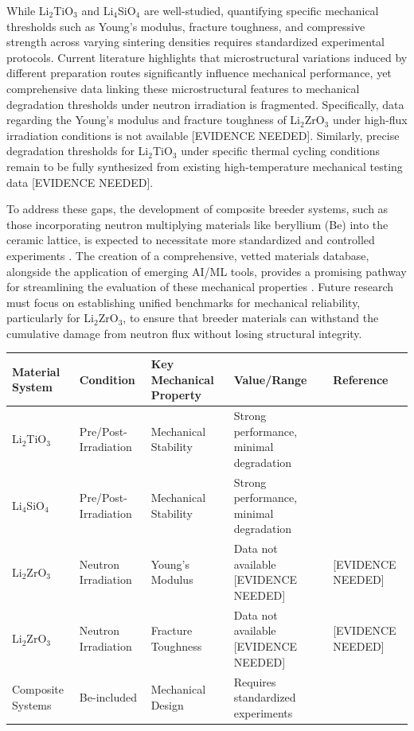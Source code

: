 \documentclass[review,12pt,a4paper]{elsarticle}
\begin{document}
\textcolor{highconf}{While Li$_{2}$TiO$_{3}$ and Li$_{4}$SiO$_{4}$ are well-studied, quantifying specific mechanical thresholds such as Young's modulus, fracture toughness, and compressive strength across varying sintering densities requires standardized experimental protocols. Current literature highlights that microstructural variations induced by different preparation routes significantly influence mechanical performance, yet comprehensive data linking these microstructural features to mechanical degradation thresholds under neutron irradiation is fragmented. Specifically, data regarding the Young's modulus and fracture toughness of Li$_{2}$ZrO$_{3}$ under high-flux irradiation conditions is not available [EVIDENCE NEEDED]. Similarly, precise degradation thresholds for Li$_{2}$TiO$_{3}$ under specific thermal cycling conditions remain to be fully synthesized from existing high-temperature mechanical testing data [EVIDENCE NEEDED].}

\textcolor{highconf}{To address these gaps, the development of composite breeder systems, such as those incorporating neutron multiplying materials like beryllium (Be) into the ceramic lattice, is expected to necessitate more standardized and controlled experiments \citep{tan_scalable_2025}. The creation of a comprehensive, vetted materials database, alongside the application of emerging AI/ML tools, provides a promising pathway for streamlining the evaluation of these mechanical properties \citep{tan_scalable_2025}. Future research must focus on establishing unified benchmarks for mechanical reliability, particularly for Li$_{2}$ZrO$_{3}$, to ensure that breeder materials can withstand the cumulative damage from neutron flux without losing structural integrity.}


\begin{table}[htb]
\centering
\begin{tabular}{lllll}
\hline
Material System & Condition & Key Mechanical Property & Value/Range & Reference \\
\hline
Li$_{2}$TiO$_{3}$ & Pre/Post-Irradiation & Mechanical Stability & Strong performance, minimal degradation & \citep{tan_scalable_2025} \\
Li$_{4}$SiO$_{4}$ & Pre/Post-Irradiation & Mechanical Stability & Strong performance, minimal degradation & \citep{tan_scalable_2025} \\
Li$_{2}$ZrO$_{3}$ & Neutron Irradiation & Young's Modulus & Data not available [EVIDENCE NEEDED] & [EVIDENCE NEEDED] \\
Li$_{2}$ZrO$_{3}$ & Neutron Irradiation & Fracture Toughness & Data not available [EVIDENCE NEEDED] & [EVIDENCE NEEDED] \\
Composite Systems & Be-included & Mechanical Design & Requires standardized experiments & \citep{tan_scalable_2025} \\
\hline
\end{tabular}
\end{table}
\end{document}
